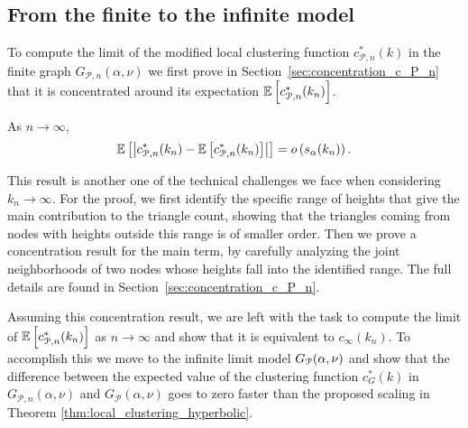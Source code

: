 \subsection{From the finite to the infinite model}

To compute the limit of the modified local clustering function $c_{\mathcal{P},n}^\ast(k)$ in the finite graph $G_{\mathcal{P},n}(\alpha, \nu)$ we first prove in Section~\ref{sec:concentration_c_P_n} that it is concentrated around its expectation $\mathbb{E}\left[c_{\mathcal{P},n}^\ast(k_n)\right]$.


\begin{proposition}\label{prop:concentration_local_clustering_P_n}
As $n \to \infty$,
\[
	\mathbb{E}\left[\left|c_{\mathcal{P},n}^\ast(k_n) - \mathbb{E}\left[c_{\mathcal{P},n}^\ast(k_n)\right]\right|\right] = o\left(s_\alpha(k_n)\right).
\]
\end{proposition}

This result is another one of the technical challenges we face when considering $k_n \to \infty$. For the proof, we first identify the specific range of heights that give the main contribution to the triangle count, showing that the triangles coming from nodes with heights outside this range is of smaller order. Then we prove a concentration result for the main term, by carefully analyzing the joint neighborhoods of two nodes whose heights fall into the identified range. The full details are found in Section~\ref{sec:concentration_c_P_n}.

Assuming this concentration result, we are left with the task to compute the limit of $\mathbb{E}\left[c_{\mathcal{P},n}^\ast(k_n)\right]$ as $n \to \infty$ and show that it is equivalent to $c_\infty(k_n)$. To accomplish this we move to the infinite limit model $G_{{\mathcal P}}(\alpha,\nu)$ and show that the difference between the expected value of the clustering function $c_G^\ast(k)$ in $G_{\mathcal{P},n}(\alpha,\nu)$ and $G_{\mathcal{P}}(\alpha,\nu)$ goes to zero faster than the proposed scaling in Theorem \ref{thm:local_clustering_hyperbolic}.


